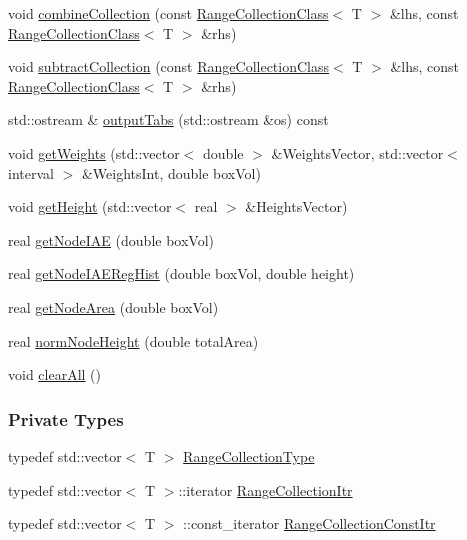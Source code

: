 \begin{DoxyCompactItemize}
\item 
void \hyperlink{classsubpavings_1_1RangeCollectionClass_a6bfb2802ef229b5671ce6e095fd5004e}{combine\-Collection} (const \hyperlink{classsubpavings_1_1RangeCollectionClass}{\-Range\-Collection\-Class}$<$ \-T $>$ \&lhs, const \hyperlink{classsubpavings_1_1RangeCollectionClass}{\-Range\-Collection\-Class}$<$ \-T $>$ \&rhs)
\item 
void \hyperlink{classsubpavings_1_1RangeCollectionClass_a5a93572c908847119d9f562208088792}{subtract\-Collection} (const \hyperlink{classsubpavings_1_1RangeCollectionClass}{\-Range\-Collection\-Class}$<$ \-T $>$ \&lhs, const \hyperlink{classsubpavings_1_1RangeCollectionClass}{\-Range\-Collection\-Class}$<$ \-T $>$ \&rhs)
\item 
std\-::ostream \& \hyperlink{classsubpavings_1_1RangeCollectionClass_a853143f43198b6f2dbfffbe364e75d09}{output\-Tabs} (std\-::ostream \&os) const 
\item 
void \hyperlink{classsubpavings_1_1RangeCollectionClass_a6173b655063220537c3630f1347cfdd5}{get\-Weights} (std\-::vector$<$ double $>$ \&\-Weights\-Vector, std\-::vector$<$ interval $>$ \&\-Weights\-Int, double box\-Vol)
\item 
void \hyperlink{classsubpavings_1_1RangeCollectionClass_a14b0dd04add88d021dc3a67a3a1c8656}{get\-Height} (std\-::vector$<$ real $>$ \&\-Heights\-Vector)
\item 
real \hyperlink{classsubpavings_1_1RangeCollectionClass_aa2490dc5f0d3e9651753ad6aea148c1b}{get\-Node\-I\-A\-E} (double box\-Vol)
\item 
real \hyperlink{classsubpavings_1_1RangeCollectionClass_a638fb0cb53c34ae359743cd22d6da8ee}{get\-Node\-I\-A\-E\-Reg\-Hist} (double box\-Vol, double height)
\item 
real \hyperlink{classsubpavings_1_1RangeCollectionClass_a364b0e829d6f1dea3b2cb9085036dd2c}{get\-Node\-Area} (double box\-Vol)
\item 
real \hyperlink{classsubpavings_1_1RangeCollectionClass_a4a8632e2e2f9f9743256c7dbaa7a7529}{norm\-Node\-Height} (double total\-Area)
\item 
void \hyperlink{classsubpavings_1_1RangeCollectionClass_ac728d483dcb418354e6286c8b6db08e1}{clear\-All} ()
\end{DoxyCompactItemize}
\subsubsection*{\-Private \-Types}
\begin{DoxyCompactItemize}
\item 
typedef std\-::vector$<$ \-T $>$ \hyperlink{classsubpavings_1_1RangeCollectionClass_aad6b97397ee955fe4ed74e1d8dc0776a}{\-Range\-Collection\-Type}
\item 
typedef std\-::vector$<$ \-T $>$\-::iterator \hyperlink{classsubpavings_1_1RangeCollectionClass_afc18b2f0242b0fc4314bbf8af2cc7034}{\-Range\-Collection\-Itr}
\item 
typedef std\-::vector$<$ \-T $>$\*
\-::const\-\_\-iterator \hyperlink{classsubpavings_1_1RangeCollectionClass_a636405dad973d70f8addd86d416418ca}{\-Range\-Collection\-Const\-Itr}
\end{DoxyCompactItemize}
